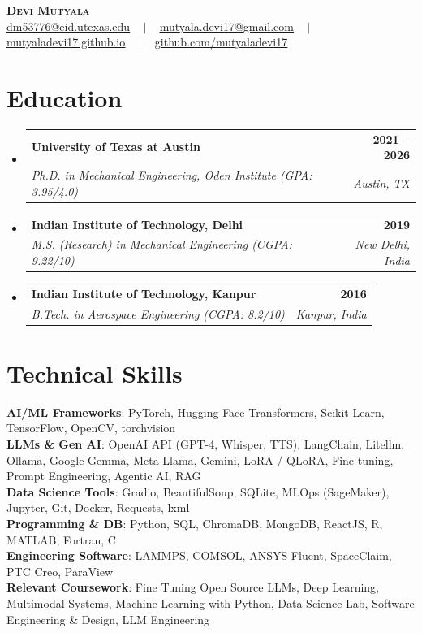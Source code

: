 \documentclass[letterpaper,11pt]{article}
\makeatletter
\newcommand{\resumeSubheading}[4]{
  \vspace{-2pt}\item
    \begin{tabular*}{1.0\textwidth}[t]{l@{\extracolsep{\fill}}r}
      \textbf{#1} & \textbf{\small #2} \\
      \textit{\small#3} & \textit{\small #4} \\
    \end{tabular*}\vspace{-7pt}
}
\newcommand{\resumeSubHeadingListStart}{\begin{itemize}[leftmargin=0.0in, label={}]}
\newcommand{\resumeSubHeadingListEnd}{\end{itemize}}
\makeatother
\begin{document}
\begin{center}
    \textbf{\Huge \scshape Devi Mutyala} \\ \vspace{2pt}
    \small \href{mailto:dm53776@eid.utexas.edu}{\underline{dm53776@eid.utexas.edu}} ~ $\vert$ ~ 
    \href{mailto:mutyala.devi17@gmail.com}{\underline{mutyala.devi17@gmail.com}} ~ $\vert$ ~
    \href{https://mutyaladevi17.github.io/}{\underline{mutyaladevi17.github.io}} ~ $\vert$ ~
    \href{https://github.com/mutyaladevi17}{\underline{github.com/mutyaladevi17}}
\end{center}


\section{Education}
  \resumeSubHeadingListStart
    \resumeSubheading
      {University of Texas at Austin}{2021 -- 2026}
      {Ph.D. in Mechanical Engineering, Oden Institute (GPA: 3.95/4.0)}{Austin, TX}
    \resumeSubheading
      {Indian Institute of Technology, Delhi}{2019}
      {M.S. (Research) in Mechanical Engineering (CGPA: 9.22/10)}{New Delhi, India}
    \resumeSubheading
      {Indian Institute of Technology, Kanpur}{2016}
      {B.Tech. in Aerospace Engineering (CGPA: 8.2/10)}{Kanpur, India}
  \resumeSubHeadingListEnd


\section{Technical Skills}
 \begin{itemize}[leftmargin=0.15in, label={}]
    \small{\item{
     \textbf{AI/ML Frameworks}{: PyTorch, Hugging Face Transformers, Scikit-Learn, TensorFlow, OpenCV, torchvision} \\
     \textbf{LLMs \& Gen AI}{: OpenAI API (GPT-4, Whisper, TTS), LangChain, Litellm, Ollama, Google Gemma, Meta Llama, Gemini, LoRA / QLoRA, Fine-tuning, Prompt Engineering, Agentic AI, RAG} \\
     \textbf{Data Science Tools}{: Gradio, BeautifulSoup, SQLite, MLOps (SageMaker), Jupyter, Git, Docker, Requests, lxml} \\
     \textbf{Programming \& DB}{: Python, SQL, ChromaDB, MongoDB, ReactJS, R, MATLAB, Fortran, C} \\
     \textbf{Engineering Software}{: LAMMPS, COMSOL, ANSYS Fluent, SpaceClaim, PTC Creo, ParaView} \\
     \textbf{Relevant Coursework}{: Fine Tuning Open Source LLMs, Deep Learning, Multimodal Systems, Machine Learning with Python, Data Science Lab, Software Engineering \& Design, LLM Engineering}
    }}
 \end{itemize}
\end{document}
